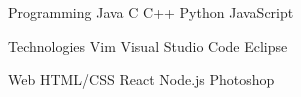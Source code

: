 



\begin{cvskills}

  \cvskill
    {Programming} %
    {Java \enskip\cdotp\enskip C \enskip\cdotp\enskip C++ \enskip\cdotp\enskip Python \enskip\cdotp\enskip JavaScript} %

  \cvskill
    {Technologies} %
    {Vim \enskip\cdotp\enskip Visual Studio Code \enskip\cdotp\enskip Eclipse} %

 \cvskill
    {Web} %
    {HTML/CSS \enskip\cdotp\enskip React \enskip\cdotp\enskip Node.js \enskip\cdotp\enskip Photoshop} %
    
\end{cvskills}